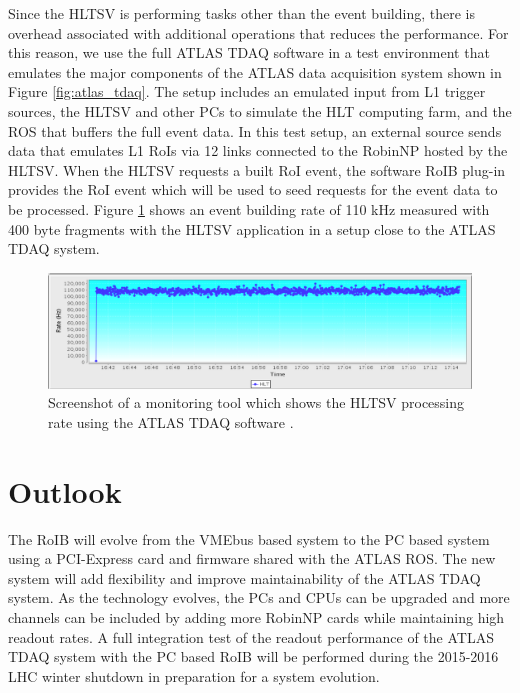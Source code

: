 \documentclass{JINST}
\begin{document}
Since the HLTSV is performing tasks other than the event building, there is overhead associated with additional operations 
that reduces the performance. For this reason, we use the full ATLAS TDAQ software in a test environment that emulates the major components of the ATLAS data acquisition system shown in Figure \ref{fig:atlas_tdaq}. The setup includes an emulated input from L1 trigger sources, 
the HLTSV and other PCs to simulate the HLT computing farm, and the ROS that buffers the full event data. 
 In this test setup, an external source sends data that emulates L1 RoIs via 12 links connected to the 
RobinNP hosted by the HLTSV. When the HLTSV requests a built RoI event, the software RoIB plug-in provides the RoI event which will be used 
to seed requests for the event data to be processed.
 Figure \ref{fig:partition} shows an event building rate of 110 kHz measured with 400 byte fragments with the HLTSV application in a setup close to the ATLAS TDAQ system. 

\begin{figure}[tbp] %
\centering
\includegraphics[width=.98\textwidth]{figures/12ch.png}
\caption{Screenshot of a monitoring tool which shows the HLTSV processing rate using the ATLAS TDAQ software .}
\label{fig:partition}
\end{figure}


\section{Outlook}\label{sec:outlook}

The RoIB will evolve from the VMEbus based system to the PC based system using a PCI-Express card and firmware shared with the 
ATLAS ROS. The new system will add flexibility and improve maintainability of the ATLAS TDAQ system. As the technology 
evolves, the PCs and CPUs can be upgraded and more channels can be included by adding more RobinNP cards while maintaining high 
readout rates. A full integration test of the readout performance of the ATLAS TDAQ system with the PC based RoIB will be performed 
during the 2015-2016 LHC winter shutdown in preparation for a system evolution.
\end{document}
